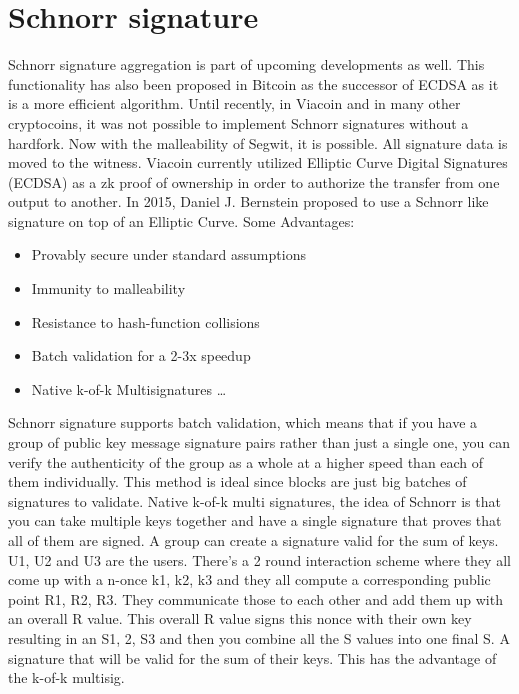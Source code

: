 \documentclass{article}
\begin{document}
\section{Schnorr signature}\label{sec: Schnorr signature}
Schnorr signature aggregation is part of upcoming developments as well. This functionality has also been proposed in Bitcoin
as the successor of ECDSA as it is a more efficient algorithm. Until recently, in Viacoin and in many other cryptocoins, it
was not possible to implement Schnorr signatures without a hardfork. Now with the malleability of Segwit, it is possible.
All signature data is moved to the witness.
Viacoin currently utilized Elliptic Curve Digital Signatures (ECDSA) as a zk proof of
ownership in order to authorize the transfer from one output to another. In 2015,
Daniel J. Bernstein proposed to use a Schnorr like signature on top of an Elliptic Curve.
\newline \newline
Some Advantages:
\begin{itemize}
\item Provably secure under standard assumptions
\item Immunity to malleability
\item Resistance to hash-function collisions
\item Batch validation for a 2-3x speedup
\item Native k-of-k Multisignatures \ldots
\end{itemize}
\noindent
Schnorr signature supports batch validation, which means that if you have a group of public key
message signature pairs rather than just a single one, you can verify the authenticity of the group as a whole
at a higher speed than each of them individually. This method is ideal since blocks are just big batches of signatures to
validate.
\linebreak \noindent
Native k-of-k multi signatures, the idea of Schnorr is that you can take multiple keys
together and have a single signature that proves that all of them are signed.
A group can create a signature valid for the sum of keys.
U1, U2 and U3 are the users. There’s a 2 round interaction scheme where they all
come up with a n-once k1, k2, k3 and they all compute a corresponding public
point R1, R2, R3. They communicate those to each other and add them up with
an overall R value. This overall R value signs this nonce with their own key
resulting in an S1, 2, S3 and then you combine all the S values into one final S. A
signature that will be valid for the sum of their keys. This has the advantage of
the k-of-k multisig.
\linebreak
\end{document}

